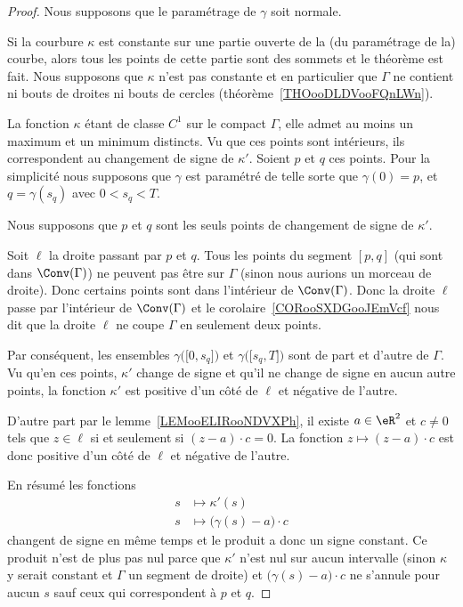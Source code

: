 \begin{proof}
	Nous supposons que le paramétrage de \( \gamma\) soit normale.

	Si la courbure \( \kappa\) est constante sur une partie ouverte de la (du paramétrage de la) courbe, alors tous les points de cette partie sont des sommets et le théorème est fait. Nous supposons que \( \kappa\) n'est pas constante et en particulier que \( \Gamma\) ne contient ni bouts de droites ni bouts de cercles (théorème~\ref{THOooDLDVooFQnLWn}).

	La fonction \( \kappa\) étant de classe \( C^1\) sur le compact \( \Gamma\), elle admet au moins un maximum et un minimum distincts. Vu que ces points sont intérieurs, ils correspondent au changement de signe de \( \kappa'\). Soient \( p\) et \( q\) ces points. Pour la simplicité nous supposons que \( \gamma\) est paramétré de telle sorte que \( \gamma(0)=p\), et \( q=\gamma(s_q)\) avec \( 0<s_q<T\).

	Nous supposons que \( p\) et \( q\) sont les seuls points de changement de signe de \( \kappa'\).

	Soit \( \ell\) la droite passant par \( p\) et \( q\). Tous les points du segment \( [p,q]\) (qui sont dans \( \Conv(\Gamma)\)) ne peuvent pas être sur \( \Gamma\) (sinon nous aurions un morceau de droite). Donc certains points sont dans l'intérieur de \( \Conv(\Gamma)\). Donc la droite \( \ell\) passe par l'intérieur de \( \Conv(\Gamma)\) et le corolaire~\ref{CORooSXDGooJEmVcf} nous dit que la droite \( \ell\) ne coupe \( \Gamma\) en seulement deux points.

	Par conséquent, les ensembles \( \gamma\big( \mathopen[ 0 , s_q \mathclose] \big)\) et \( \gamma\big( \mathopen[ s_q , T \mathclose] \big)\) sont de part et d'autre de \( \Gamma\). Vu qu'en ces points, \( \kappa'\) change de signe et qu'il ne change de signe en aucun autre points, la fonction \( \kappa'\) est positive d'un côté de \( \ell\) et négative de l'autre.

	D'autre part par le lemme~\ref{LEMooELIRooNDVXPh}, il existe \( a\in \eR^2\) et \( c\neq 0\) tels que \( z\in\ell\) si et seulement si \( (z-a)\cdot c=0\). La fonction \( z\mapsto (z-a)\cdot c\) est donc positive d'un côté de \( \ell\) et négative de l'autre.

	En résumé les fonctions
	\begin{subequations}
		\begin{align}
			s & \mapsto \kappa'(s)                     \\
			s & \mapsto \big( \gamma(s)-a \big)\cdot c
		\end{align}
	\end{subequations}
	changent de signe en même temps et le produit a donc un signe constant. Ce produit n'est de plus pas nul parce que \( \kappa'\) n'est nul sur aucun intervalle (sinon \( \kappa\) y serait constant et \( \Gamma\) un segment de droite) et \( \big( \gamma(s)-a \big)\cdot c\) ne s'annule pour aucun \( s\) sauf ceux qui correspondent à \( p\) et \( q\).


\end{proof}
